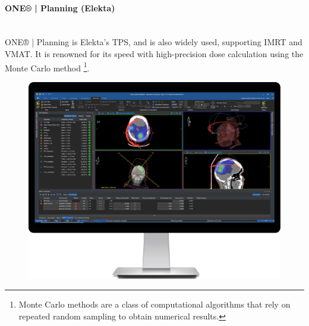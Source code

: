\Needspace{7cm}
\begin{multicols}{2}
	\paragraph{ONE® | Planning (Elekta)}
	\ \\
	ONE® | Planning \cite{one_planning} is Elekta's TPS, and is also widely used, supporting IMRT and VMAT.
	It is renowned for its speed with high-precision dose calculation using the Monte Carlo method
	\footnote{
		Monte Carlo methods are a class of computational algorithms that rely on repeated random sampling to obtain numerical results.
	}.
	
	\columnbreak
	
	\begin{figure}[H]
		\centering
		\includegraphics[width=\linewidth]{OnePlanningElekta.png}
		\label{peudofig:screenshot_one_planning}
	\end{figure}
\end{multicols}

